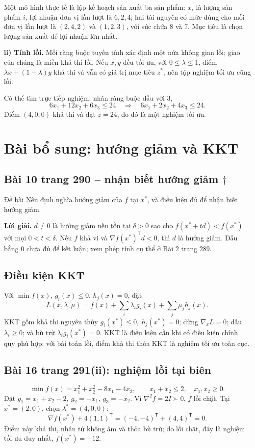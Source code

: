 \documentclass[11pt,a4paper]{article}
\newcommand{\grad}{\nabla}
\newcommand{\Hess}{\nabla^2}
\newcommand{\T}{^{\mathsf T}}
\begin{document}
Một mô hình thực tế là lập kế hoạch sản xuất ba sản phẩm: \(x_i\) là lượng sản phẩm \(i\), lợi nhuận đơn vị lần lượt là \(6,2,4\); hai tài nguyên có mức dùng cho mỗi đơn vị lần lượt là \((2,4,2)\) và \((1,2,3)\), với sức chứa \(8\) và \(7\). Mục tiêu là chọn lượng sản xuất để lợi nhuận lớn nhất.

\textbf{ii) Tính lồi.} Mỗi ràng buộc tuyến tính xác định một nửa không gian lồi; giao của chúng là miền khả thi lồi. Nếu \(x,y\) đều tối ưu, với \(0\le\lambda\le1\), điểm \(\lambda x+(1-\lambda)y\) khả thi và vẫn có giá trị mục tiêu \(z^\ast\), nên tập nghiệm tối ưu cũng lồi.

Có thể tìm trực tiếp nghiệm: nhân ràng buộc đầu với \(3\),
\[
6x_1+12x_2+6x_3\le24
\quad\Longrightarrow\quad
6x_1+2x_2+4x_3\le24.
\]
Điểm \((4,0,0)\) khả thi và đạt \(z=24\), do đó là một nghiệm tối ưu.


\section{Bài bổ sung: hướng giảm và KKT}
\subsection{Bài 10 trang 290 -- nhận biết hướng giảm \(\dagger\)}
\begin{questionbox}{Đề bài}
Nêu định nghĩa hướng giảm của \(f\) tại \(x^\ast\), và điều kiện đủ để nhận biết hướng giảm.
\end{questionbox}
\textbf{Lời giải.} \(d\ne0\) là hướng giảm nếu tồn tại \(\delta>0\) sao cho \(f(x^\ast+td)<f(x^\ast)\) với mọi \(0<t<\delta\). Nếu \(f\) khả vi và \(\grad f(x^\ast)\T d<0\), thì \(d\) là hướng giảm. Dấu bằng \(0\) chưa đủ để kết luận; xem phép tính cụ thể ở Bài 2 trang 289.

\subsection{Điều kiện KKT}
Với \(\min f(x)\), \(g_i(x)\le0\), \(h_j(x)=0\), đặt
\[
L(x,\lambda,\mu)=f(x)+\sum_i\lambda_i g_i(x)+\sum_j\mu_jh_j(x).
\]
KKT gồm khả thi nguyên thủy \(g_i(x^\ast)\le0,\ h_j(x^\ast)=0\); dừng \(\grad_xL=0\); dấu \(\lambda_i\ge0\); và bù trừ \(\lambda_i g_i(x^\ast)=0\). KKT là điều kiện cần khi có điều kiện chính quy phù hợp; với bài toán lồi, điểm khả thi thỏa KKT là nghiệm tối ưu toàn cục.

\subsection{Bài 16 trang 291(ii): nghiệm lồi tại biên}
\[
\min f(x)=x_1^2+x_2^2-8x_1-4x_2,\qquad
x_1+x_2\le2,\quad x_1,x_2\ge0.
\]
Đặt \(g_1=x_1+x_2-2,\ g_2=-x_1,\ g_3=-x_2\). Vì \(\Hess f=2I\succ0\), \(f\) lồi chặt. Tại \(x^\ast=(2,0)\), chọn \(\lambda^\ast=(4,0,0)\):
\[
\grad f(x^\ast)+4(1,1)\T=(-4,-4)\T+(4,4)\T=0.
\]
Điểm này khả thi, nhân tử không âm và thỏa bù trừ; do lồi chặt, đây là nghiệm tối ưu duy nhất, \(f(x^\ast)=-12\).
\end{document}
